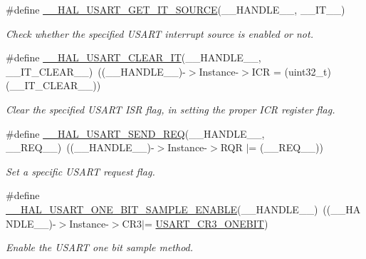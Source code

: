 \begin{DoxyCompactItemize}
\#define \hyperlink{group___u_s_a_r_t___exported___macros_ga3ab781c75a319bd41e4b64098259f018}{\+\_\+\+\_\+\+H\+A\+L\+\_\+\+U\+S\+A\+R\+T\+\_\+\+G\+E\+T\+\_\+\+I\+T\+\_\+\+S\+O\+U\+R\+CE}(\+\_\+\+\_\+\+H\+A\+N\+D\+L\+E\+\_\+\+\_\+,  \+\_\+\+\_\+\+I\+T\+\_\+\+\_\+)
\begin{DoxyCompactList}\small\item\em Check whether the specified U\+S\+A\+RT interrupt source is enabled or not. \end{DoxyCompactList}\item 
\#define \hyperlink{group___u_s_a_r_t___exported___macros_gada9f2da0bfc3dfd21ccb161d2ef26e93}{\+\_\+\+\_\+\+H\+A\+L\+\_\+\+U\+S\+A\+R\+T\+\_\+\+C\+L\+E\+A\+R\+\_\+\+IT}(\+\_\+\+\_\+\+H\+A\+N\+D\+L\+E\+\_\+\+\_\+,  \+\_\+\+\_\+\+I\+T\+\_\+\+C\+L\+E\+A\+R\+\_\+\+\_\+)~((\+\_\+\+\_\+\+H\+A\+N\+D\+L\+E\+\_\+\+\_\+)-\/$>$Instance-\/$>$I\+CR = (uint32\+\_\+t)(\+\_\+\+\_\+\+I\+T\+\_\+\+C\+L\+E\+A\+R\+\_\+\+\_\+))
\begin{DoxyCompactList}\small\item\em Clear the specified U\+S\+A\+RT I\+SR flag, in setting the proper I\+CR register flag. \end{DoxyCompactList}\item 
\#define \hyperlink{group___u_s_a_r_t___exported___macros_ga3e5b085032deb672887905a7587063e3}{\+\_\+\+\_\+\+H\+A\+L\+\_\+\+U\+S\+A\+R\+T\+\_\+\+S\+E\+N\+D\+\_\+\+R\+EQ}(\+\_\+\+\_\+\+H\+A\+N\+D\+L\+E\+\_\+\+\_\+,  \+\_\+\+\_\+\+R\+E\+Q\+\_\+\+\_\+)~((\+\_\+\+\_\+\+H\+A\+N\+D\+L\+E\+\_\+\+\_\+)-\/$>$Instance-\/$>$R\+QR $\vert$= (\+\_\+\+\_\+\+R\+E\+Q\+\_\+\+\_\+))
\begin{DoxyCompactList}\small\item\em Set a specific U\+S\+A\+RT request flag. \end{DoxyCompactList}\item 
\#define \hyperlink{group___u_s_a_r_t___exported___macros_gab18a3100efa1cf12b5874cadec193e04}{\+\_\+\+\_\+\+H\+A\+L\+\_\+\+U\+S\+A\+R\+T\+\_\+\+O\+N\+E\+\_\+\+B\+I\+T\+\_\+\+S\+A\+M\+P\+L\+E\+\_\+\+E\+N\+A\+B\+LE}(\+\_\+\+\_\+\+H\+A\+N\+D\+L\+E\+\_\+\+\_\+)~((\+\_\+\+\_\+\+H\+A\+N\+D\+L\+E\+\_\+\+\_\+)-\/$>$Instance-\/$>$C\+R3$\vert$= \hyperlink{group___peripheral___registers___bits___definition_ga9a96fb1a7beab602cbc8cb0393593826}{U\+S\+A\+R\+T\+\_\+\+C\+R3\+\_\+\+O\+N\+E\+B\+IT})
\begin{DoxyCompactList}\small\item\em Enable the U\+S\+A\+RT one bit sample method. \end{DoxyCompactList}\item 

\end{DoxyCompactItemize}
